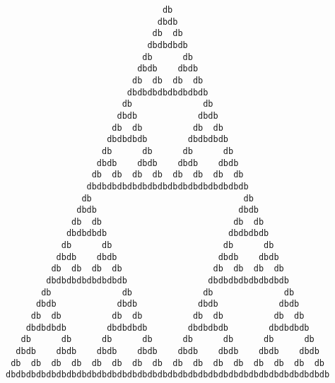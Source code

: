\documentclass{article}
\begin{document}
\vfill
\centering
\fontsize{6pt}{5.5pt}
\begin{BVerbatim}
                               db
                              dbdb
                             db  db
                            dbdbdbdb
                           db      db
                          dbdb    dbdb
                         db  db  db  db
                        dbdbdbdbdbdbdbdb
                       db              db
                      dbdb            dbdb
                     db  db          db  db
                    dbdbdbdb        dbdbdbdb
                   db      db      db      db
                  dbdb    dbdb    dbdb    dbdb
                 db  db  db  db  db  db  db  db
                dbdbdbdbdbdbdbdbdbdbdbdbdbdbdbdb
               db                              db
              dbdb                            dbdb
             db  db                          db  db
            dbdbdbdb                        dbdbdbdb
           db      db                      db      db
          dbdb    dbdb                    dbdb    dbdb
         db  db  db  db                  db  db  db  db
        dbdbdbdbdbdbdbdb                dbdbdbdbdbdbdbdb
       db              db              db              db
      dbdb            dbdb            dbdb            dbdb
     db  db          db  db          db  db          db  db
    dbdbdbdb        dbdbdbdb        dbdbdbdb        dbdbdbdb
   db      db      db      db      db      db      db      db
  dbdb    dbdb    dbdb    dbdb    dbdb    dbdb    dbdb    dbdb
 db  db  db  db  db  db  db  db  db  db  db  db  db  db  db  db
dbdbdbdbdbdbdbdbdbdbdbdbdbdbdbdbdbdbdbdbdbdbdbdbdbdbdbdbdbdbdbdb
\end{BVerbatim}
\end{document}
